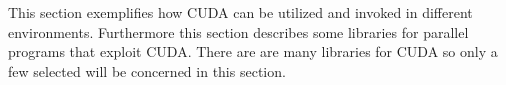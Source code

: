 This section exemplifies how CUDA can be utilized and invoked in different environments.
Furthermore this section describes some libraries for parallel programs that exploit CUDA.
There are are many libraries for CUDA so only a few selected will be concerned in this section.